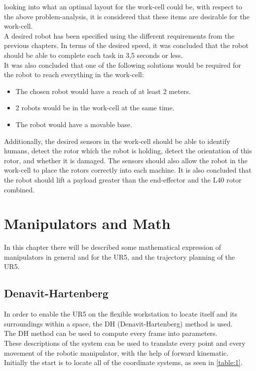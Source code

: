 looking into what an optimal layout for the work-cell could be, with respect to the above problem-analysis, it is considered that these items are desirable for the work-cell.\\
A desired robot has been specified using the different requirements from the previous chapters. In terms of the desired speed, it was concluded that the robot should be able to complete each task in 3,5 seconds or less.\\
It was also concluded that one of the following solutions would be required for the robot to reach everything in the work-cell: 
\begin{itemize}
    \item The chosen robot would have a reach of at least 2 meters.
    \item 2 robots would be in the work-cell at the same time. 
    \item The robot would have a movable base. 
\end{itemize} 
Additionally, the desired sensors in the work-cell should be able to identify humans, detect the rotor which the robot is holding, detect the orientation of this rotor, and whether it is damaged. The sensors should also allow the robot in the work-cell to place the rotors correctly into each machine. It is also concluded that the robot should lift a payload greater than the end-effector and the L40 rotor combined.\\

\chapter{Manipulators and Math}\label{ch:kinematics}

In this chapter there will be described some mathematical expression of manipulators in general and for the UR5, and the trajectory planning of the UR5.

\section{Denavit-Hartenberg}

In order to enable the UR5 on the flexible workstation to locate itself and its surroundings within a space, the DH (Denavit-Hartenberg) method is used.\\ 
The DH method can be used to compute every frame into parameters.\\
These descriptions of the system can be used to translate every point and every movement of the robotic manipulator, with the help of forward kinematic.\\
Initially the start is to locate all of the coordinate systems, as seen in \ref{table:1}.\\ 


